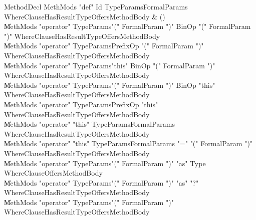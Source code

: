 \begin{bbgrammar}

MethodDecl \label{prod:MethodDecl}  \: MethMods \xcd"def" Id TypeParams\opt FormalParams WhereClause\opt HasResultType\opt Offers\opt MethodBody & () \\

    \| MethMods \xcd"operator" TypeParams\opt \xcd"(" FormalParam  \xcd")" BinOp \xcd"(" FormalParam  \xcd")" WhereClause\opt HasResultType\opt Offers\opt MethodBody \\
    \| MethMods \xcd"operator" TypeParams\opt PrefixOp \xcd"(" FormalParam  \xcd")" WhereClause\opt HasResultType\opt Offers\opt MethodBody \\
    \| MethMods \xcd"operator" TypeParams\opt \xcd"this" BinOp \xcd"(" FormalParam  \xcd")" WhereClause\opt HasResultType\opt Offers\opt MethodBody \\
    \| MethMods \xcd"operator" TypeParams\opt \xcd"(" FormalParam  \xcd")" BinOp \xcd"this" WhereClause\opt HasResultType\opt Offers\opt MethodBody \\
    \| MethMods \xcd"operator" TypeParams\opt PrefixOp \xcd"this" WhereClause\opt HasResultType\opt Offers\opt MethodBody \\
    \| MethMods \xcd"operator" \xcd"this" TypeParams\opt FormalParams WhereClause\opt HasResultType\opt Offers\opt MethodBody \\
    \| MethMods \xcd"operator" \xcd"this" TypeParams\opt FormalParams \xcd"=" \xcd"(" FormalParam  \xcd")" WhereClause\opt HasResultType\opt Offers\opt MethodBody \\
    \| MethMods \xcd"operator" TypeParams\opt \xcd"(" FormalParam  \xcd")" \xcd"as" Type WhereClause\opt Offers\opt MethodBody \\
    \| MethMods \xcd"operator" TypeParams\opt \xcd"(" FormalParam  \xcd")" \xcd"as" \xcd"?" WhereClause\opt HasResultType\opt Offers\opt MethodBody \\
    \| MethMods \xcd"operator" TypeParams\opt \xcd"(" FormalParam  \xcd")" WhereClause\opt HasResultType\opt Offers\opt MethodBody \\

\end{bbgrammar}

